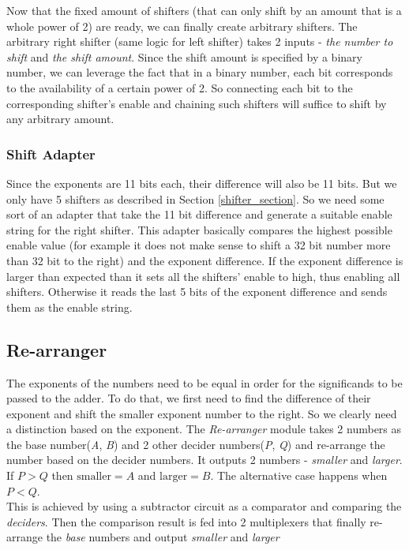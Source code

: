 \documentclass[14pt]{article}
\begin{document}
Now that the fixed amount of shifters (that can only shift by an amount that is a whole power of 2) are ready, we can finally create arbitrary shifters. The arbitrary right shifter (same logic for left shifter) takes 2 inputs - \textit{the number to shift} and \textit{the shift amount}. Since the shift amount is specified by a binary number, we can leverage the fact that in a binary number, each bit corresponds to the availability of a certain power of 2. So connecting each bit to the corresponding shifter's enable and chaining such shifters will suffice to shift by any arbitrary amount.

\subsubsection{Shift Adapter}
Since the exponents are 11 bits each, their difference will also be 11 bits. But we only have 5 shifters as described in Section \ref{shifter_section}. So we need some sort of an adapter that take the 11 bit difference and generate a suitable enable string for the right shifter. This adapter basically compares the highest possible enable value (for example it does not make sense to shift a 32 bit number more than 32 bit to the right) and the exponent difference. If the exponent difference is larger than expected than it sets all the shifters' enable to high, thus enabling all shifters. Otherwise it reads the last 5 bits of the exponent difference and sends them as the enable string.

\subsection{Re-arranger}
The exponents of the numbers need to be equal in order for the significands to be passed to the adder. To do that, we first need to find the difference of their exponent and shift the smaller exponent number to the right. So we clearly need a distinction based on the exponent. The \textit{Re-arranger} module takes 2 numbers as the base number(\textit{A}, \textit{B}) and 2 other decider numbers(\textit{P}, \textit{Q}) and re-arrange the number based on the decider numbers. It outputs 2 numbers - \textit{smaller} and \textit{larger}. If $P > Q$ then $\textrm{smaller} = A$ and $\textrm{larger} = B$. The alternative case happens when $P < Q$.\\

This is achieved by using a subtractor circuit as a comparator and comparing the \textit{deciders}. Then the comparison result is fed into 2 multiplexers that finally re-arrange the \textit{base} numbers and output \textit{smaller} and \textit{larger}
\end{document}
